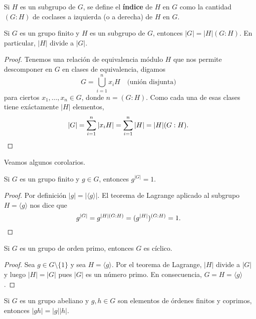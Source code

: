 \begin{definition}
	Si $H$ es un subgrupo de $G$, se define el \textbf{índice} de $H$ en $G$
	como la cantidad $(G:H)$ de coclases a izquierda (o a derecha) de $H$ en $G$. 
\end{definition}

\begin{theorem}[Lagrange]
	Si $G$ es un grupo finito y $H$ es un subgrupo de $G$, entonces
	$|G|=|H|(G:H)$. En particular, $|H|$ divide a $|G|$. 
\end{theorem}

\begin{proof}
	Tenemos una relación de equivalencia módulo $H$ que nos permite descomponer
	en $G$ en clases de equivalencia, digamos
	\[
	G=\bigcup_{i=1}^n x_iH\quad\text{(unión disjunta)}
	\]
	para ciertos $x_1,\dots,x_n\in G$, donde $n=(G:H)$. Como cada una de esas clases tiene exáctamente
	$|H|$ elementos,  
	\[
		|G|=\sum_{i=1}^n|x_iH|=\sum_{i=1}^n|H|=|H|(G:H).\qedhere
	\]
\end{proof}

Veamos algunos corolarios. 

\begin{corollary}
	Si $G$ es un grupo finito y $g\in G$, entonces $g^{|G|}=1$. 	
\end{corollary}

\begin{proof}
	Por definición $|g|=|\langle g\rangle|$. El teorema de Lagrange aplicado al
	subgrupo $H=\langle g\rangle$ nos dice que 
	\[
		g^{|G|}=g^{|H|(G:H)}=(g^{|H|})^{(G:H)}=1.\qedhere
	\]
\end{proof}

\begin{corollary}
	Si $G$ es un grupo de orden primo, entonces $G$ es cíclico.
\end{corollary}

\begin{proof}
	Sea $g\in G\setminus\{1\}$ y sea $H=\langle g\rangle$. Por el teorema de
	Lagrange, $|H|$ divide a $|G|$ y luego $|H|=|G|$ pues $|G|$ es un número
	primo. En consecuencia, $G=H=\langle g\rangle$. 
\end{proof}

\begin{corollary}
\label{cor:ordenes_coprimos}
	Si $G$ es un grupo abeliano y $g,h\in G$ son elementos de órdenes finitos y coprimos, entonces
	$|gh|=|g||h|$.
\end{corollary}

